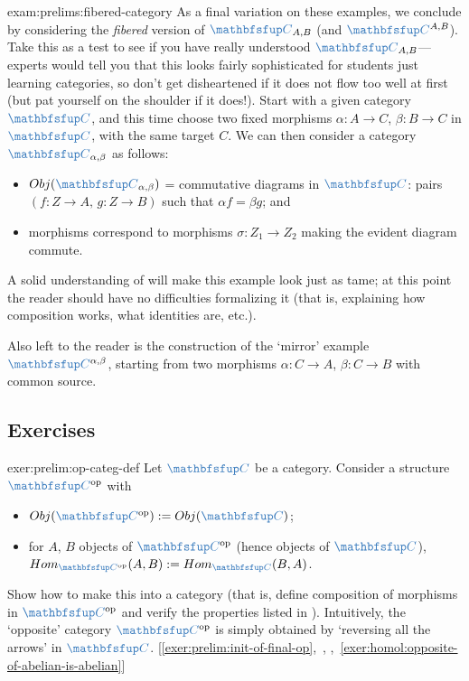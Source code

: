 \begin{exam}{}{exam:prelims:fibered-category}
  As a final variation on these examples, we conclude by considering
  the \emph{fibered} version of $\categ{C}_{A,B}$ (and
  $\categ{C}^{A,B}$). Take this as a test to see if you have really
  understood $\categ{C}_{A,B}$---experts would tell you that this
  looks fairly sophisticated for students just learning categories, so
  don't get disheartened if it does not flow too well at first (but
  pat yourself on the shoulder if it does!). Start with a given
  category $\categ{C}$, and this time choose two fixed morphisms
  $\alpha : A \to C$, $\beta : B \to C$ in $\categ{C}$, with the same
  target $C$. We can then consider a category
  $\categ{C}_{\alpha, \beta}$ as follows:
  \begin{itemize}
  \item $\Obj(\categ{C}_{\alpha,\beta})$ = commutative diagrams
    in $\categ{C}$: pairs $(f : Z \to A,\, g : Z \to B)$ such that
    $\alpha f = \beta g$; and
  \item morphisms correspond to morphisms $\sigma : Z_1 \to Z_2$
    making the evident diagram commute.
  \end{itemize}
  A solid understanding of  will
  make this example look just as tame; at this point the reader should
  have no difficulties formalizing it (that is, explaining how
  composition works, what identities are, etc.).

  Also left to the reader is the construction of the `mirror' example
  $\categ{C}^{\alpha,\beta}$, starting from two morphisms
  $\alpha : C \to A$, $\beta : C \to B$ with common source.
\end{exam}

\subsection*{Exercises}

\begin{exer}{}{exer:prelim:op-categ-def}
  \exerused{} Let $\categ{C}$ be a category. Consider a structure
  $\categ{C}^{\mathrm{op}}$ with
  \begin{itemize}
  \item $\Obj(\categ{C}^{\mathrm{op}}) := \Obj(\categ{C})$;
  \item for $A$, $B$ objects of $\categ{C}^{\mathrm{op}}$ (hence
    objects of $\categ{C}$),
    $\Hom_{\categ{C}^{\mathrm{op}}}(A, B) := \Hom_{\categ{C}}(B, A)$.
  \end{itemize}
  Show how to make this into a category (that is, define composition
  of morphisms in $\categ{C}^{\mathrm{op}}$ and verify the properties
  listed in
  ). Intuitively, the
  `opposite' category $\categ{C}^{\mathrm{op}}$ is simply obtained by
  `reversing all the arrows' in $\categ{C}$.\@
  [\ref{exer:prelim:init-of-final-op},~,
  ,~\ref{exer:homol:opposite-of-abelian-is-abelian}]
\end{exer}

